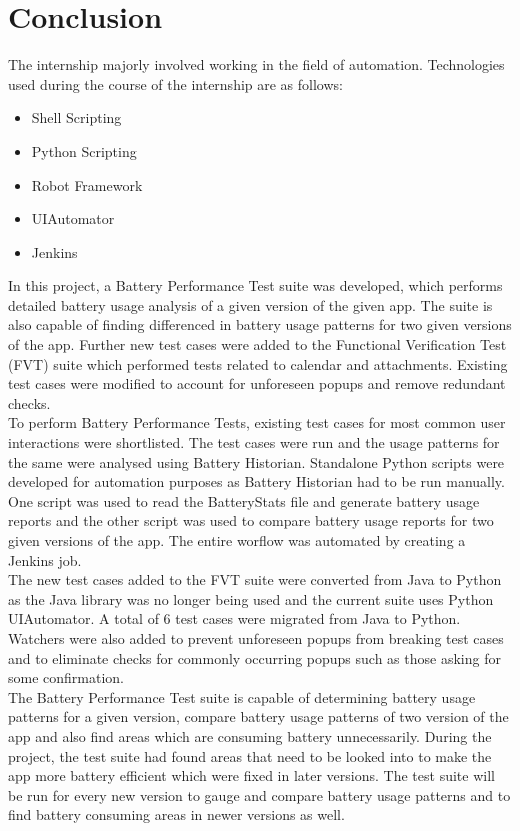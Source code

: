 \setlength\parindent{0pt}

\chapter{Conclusion}

The internship majorly involved working in the field of automation. Technologies used during the course of the internship are as follows:
\begin{itemize}
	\item Shell Scripting
	\item Python Scripting
	\item Robot Framework
	\item UIAutomator
	\item Jenkins
\end{itemize}

In this project, a Battery Performance Test suite was developed, which performs detailed battery usage analysis of a given version of the given app. The suite is also capable of finding differenced in battery usage patterns for two given versions of the app. Further new test cases were added to the Functional Verification Test (FVT) suite which performed tests related to calendar and attachments. Existing test cases were modified to account for unforeseen popups and remove redundant checks.\\

To perform Battery Performance Tests, existing test cases for most common user interactions were shortlisted. The test cases were run and the usage patterns for the same were analysed using Battery Historian. Standalone Python scripts were developed for automation purposes as Battery Historian had to be run manually. One script was used to read the BatteryStats file and generate battery usage reports and the other script was used to compare battery usage reports for two given versions of the app. The entire worflow was automated by creating a Jenkins job.\\

The new test cases added to the FVT suite were converted from Java to Python as the Java library was no longer being used and the current suite uses Python UIAutomator. A total of 6 test cases were migrated from Java to Python. Watchers were also added to prevent unforeseen popups from breaking test cases and to eliminate checks for commonly occurring popups such as those asking for some confirmation.\\ 

The Battery Performance Test suite is capable of determining battery usage patterns for a given version, compare battery usage patterns of two version of the app and also find areas which are consuming battery unnecessarily. During the project, the test suite had found areas that need to be looked into to make the app more battery efficient which were fixed in later versions. The test suite will be run for every new version to gauge and compare battery usage patterns and to find battery consuming areas in newer versions as well. \\

